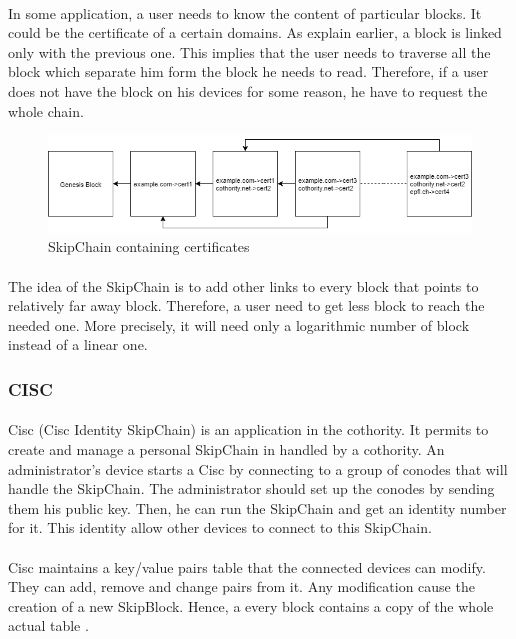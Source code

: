\documentclass[11pt, a4paper, twoside, openright]{article}
\begin{document}
\paragraph{} In some application, a user needs to know the content of particular blocks. It could be the certificate of a certain domains. As explain earlier, a block is linked only with the previous one. This implies that the user needs to traverse all the block which separate him form the block he needs to read. Therefore, if a user does not have the block on his devices for some reason, he have to request the whole chain. 
\begin{figure}
   \centering
   \includegraphics[scale=0.5]{SkipChain.png}
   \caption{SkipChain containing certificates}
\end{figure}
\paragraph{} The idea of the SkipChain is to add other links to every block that points to relatively far away block. Therefore, a user need to get less block to reach the needed one. More precisely, it will need only a logarithmic number of block instead of  a linear one.  
                 
\subsubsection{CISC}
\paragraph{}  Cisc (Cisc Identity SkipChain) is an application in the cothority. It permits to create and manage a personal SkipChain in handled by a cothority. An administrator's device starts a Cisc by connecting to a group of conodes that will handle the SkipChain. The administrator should set up the conodes by sending them his public key. Then, he can run the SkipChain and get an identity number for it. This identity allow other devices to connect to this SkipChain. 
\paragraph{}Cisc maintains a key/value pairs table that the connected devices can modify. They can add, remove and change pairs from it. Any modification cause the creation of a new SkipBlock. Hence, a every block contains a copy of the whole actual table . 
\end{document}
